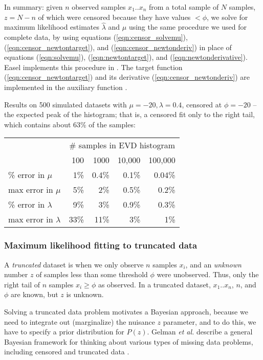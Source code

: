 In summary: given $n$ observed samples $x_1..x_n$ from a total sample
of $N$ samples, $z = N-n$ of which were censored because they have
values $< \phi$, we solve for maximum likelihood estimates
$\hat{\lambda}$ and $\hat{\mu}$ using the same procedure we used for
complete data, by using equations (\ref{eqn:censor_solvemu}),
(\ref{eqn:censor_newtontarget}), and (\ref{eqn:censor_newtonderiv}) in
place of equations (\ref{eqn:solvemu}), (\ref{eqn:newtontarget}), and
(\ref{eqn:newtonderivative}). Easel implements this procedure in
.  The target function
(\ref{eqn:censor_newtontarget}) and its derivative
(\ref{eqn:censor_newtonderiv}) are implemented in the auxiliary
function  \citep{Lawless82}.

Results on 500 simulated datasets with $\mu = -20, \lambda = 0.4$,
censored at $\phi = -20$ -- the expected peak of the histogram; that
is, a censored fit only to the right tail, which contains about 63\%
of the samples:

\begin{center}
\begin{tabular}{lrrrr} \hline
 & \multicolumn{4}{c}{\# samples in EVD histogram}\\
                        & 100 & 1000  & 10,000 & 100,000 \\
\% error in $\mu$       &  1\%& 0.4\% &  0.1\% &  0.04\%  \\
max error in $\mu$      &  5\%&   2\% &  0.5\% &  0.2\%  \\
\% error in $\lambda$   &  9\%&   3\% &  0.9\% &  0.3\%  \\
max error in $\lambda$  & 33\%&  11\% &    3\% &    1\%  \\ \hline
\end{tabular}
\end{center}

\subsubsection{Maximum likelihood fitting to truncated data}

A \emph{truncated} dataset is when we only observe $n$ samples $x_i$,
and an \emph{unknown} number $z$ of samples less than some threshold
$\phi$ were unobserved. Thus, only the right tail of $n$ samples $x_i
\geq \phi$ as observed. In a truncated dataset, $x_1..x_n$, $n$, and
$\phi$ are known, but $z$ is unknown.

Solving a truncated data problem motivates a Bayesian approach,
because we need to integrate out (marginalize) the nuisance $z$
parameter, and to do this, we have to specify a prior distribution for
$P(z)$. Gelman \emph{et al.} describe a general Bayesian framework for
thinking about various types of missing data problems, including
censored and truncated data \citep{Gelman95}.

